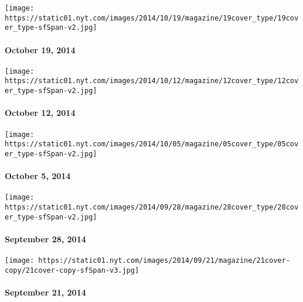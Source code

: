 \href{http://www.nytimes.com/indexes/2014/10/19/magazine/index.html}{}

\texttt{[image: https://static01.nyt.com/images/2014/10/19/magazine/19cover\_type/19cover\_type-sfSpan-v2.jpg]}

\hypertarget{october-19-2014}{%
\paragraph{October 19, 2014}\label{october-19-2014}}

\href{http://www.nytimes.com/indexes/2014/10/12/magazine/index.html}{}

\texttt{[image: https://static01.nyt.com/images/2014/10/12/magazine/12cover\_type/12cover\_type-sfSpan-v2.jpg]}

\hypertarget{october-12-2014}{%
\paragraph{October 12, 2014}\label{october-12-2014}}

\href{http://www.nytimes.com/indexes/2014/10/05/magazine/index.html}{}

\texttt{[image: https://static01.nyt.com/images/2014/10/05/magazine/05cover\_type/05cover\_type-sfSpan-v2.jpg]}

\hypertarget{october-5-2014}{%
\paragraph{October 5, 2014}\label{october-5-2014}}

\href{http://www.nytimes.com/indexes/2014/09/28/magazine/index.html}{}

\texttt{[image: https://static01.nyt.com/images/2014/09/28/magazine/28cover\_type/28cover\_type-sfSpan-v2.jpg]}

\hypertarget{september-28-2014}{%
\paragraph{September 28, 2014}\label{september-28-2014}}

\href{http://www.nytimes.com/indexes/2014/09/21/magazine/index.html}{}

\texttt{[image: https://static01.nyt.com/images/2014/09/21/magazine/21cover-copy/21cover-copy-sfSpan-v3.jpg]}

\hypertarget{september-21-2014}{%
\paragraph{September 21, 2014}\label{september-21-2014}}

